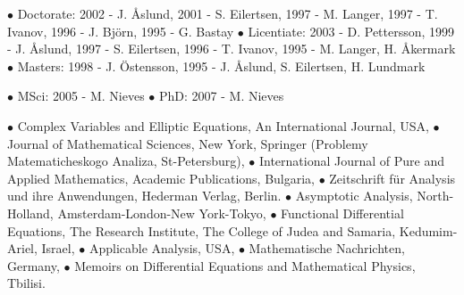 \documentclass{article}
\begin{document}
\medskip

$\bullet$ Doctorate: 
              2002 - J. {\AA}slund, 
              2001 - S. Eilertsen, 
              1997 - M. Langer, 
              1997 - T. Ivanov, 
              1996 - J. Bj\"orn,
              1995 - G. Bastay
$\bullet$ Licentiate: 
2003 - D. Pettersson,
1999 - J. {\AA}slund,
              1997 - S. Eilertsen,
              1996 - T. Ivanov,
              1995 - M. Langer, H.
{\AA}kermark
   $\bullet$ Masters: 
             1998 - J. {\"O}stensson,
              1995 - J. {\AA}slund, S.
Eilertsen, H. Lundmark

\medskip


\medskip
$\bullet$ MSci: 
            2005 - M. Nieves
$\bullet$ PhD: 
            2007 - M. Nieves            


 
   \medskip
  
     $\bullet$ Complex Variables and Elliptic Equations,  An International Journal, USA, 
      $\bullet$ Journal of Mathematical Sciences, New York, Springer 
       (Problemy Matematicheskogo Analiza, St-Petersburg), 
      $\bullet$ International Journal of Pure and Applied Mathematics, Academic Publications, Bulgaria, 
        $\bullet$ Zeitschrift f{\"u}r Analysis und
ihre Anwendungen, Hederman Verlag,  Berlin. 
     $\bullet$ Asymptotic Analysis,
North-Holland, Amsterdam-London-New York-Tokyo, 
        $\bullet$ Functional Differential Equations,
The Research Institute, The 
  College of Judea and Samaria, Kedumim-Ariel, Israel, 
        $\bullet$ Applicable Analysis, USA, 
       $\bullet$ Mathematische Nachrichten, Germany, 
 $\bullet$ Memoirs on Differential Equations and Mathematical Physics, Tbilisi.
  
\end{document}
